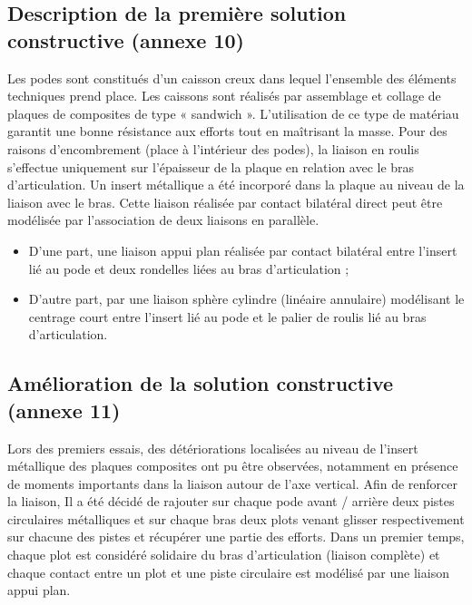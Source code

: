 \subsection{Description de la première solution constructive (annexe 10)}

Les podes sont constitués d’un caisson creux dans lequel l’ensemble des éléments techniques prend place. Les caissons sont réalisés par assemblage et collage de plaques de composites de type « sandwich ». L’utilisation de ce
type de matériau garantit une bonne résistance aux efforts tout en maîtrisant la masse.
Pour des raisons d’encombrement (place à l’intérieur des podes), la liaison en roulis s’effectue uniquement sur l’épaisseur de la plaque en relation avec le bras d’articulation. Un insert métallique a été incorporé dans la plaque au niveau de la liaison avec le bras. Cette liaison réalisée par contact bilatéral direct peut être modélisée par l’association de deux liaisons en parallèle.
\begin{itemize}
\item D’une part, une liaison appui plan réalisée par contact bilatéral entre l’insert lié au pode et deux rondelles liées
au bras d’articulation ;
\item D’autre part, par une liaison sphère cylindre (linéaire annulaire) modélisant le centrage court entre l’insert lié
au pode et le palier de roulis lié au bras d’articulation.
\end{itemize}



\subsection{Amélioration de la solution constructive (annexe 11)}

Lors des premiers essais, des détériorations localisées au niveau de l’insert métallique des plaques composites ont pu être observées, notamment en présence de moments importants dans la liaison autour de l’axe vertical. Afin de
renforcer la liaison, Il a été décidé de rajouter sur chaque pode avant / arrière deux pistes circulaires métalliques et sur chaque bras deux plots venant glisser respectivement sur chacune des pistes et récupérer une partie des efforts.
Dans un premier temps, chaque plot est considéré solidaire du bras d’articulation (liaison complète) et chaque contact entre un plot et une piste circulaire est modélisé par une liaison appui plan.

